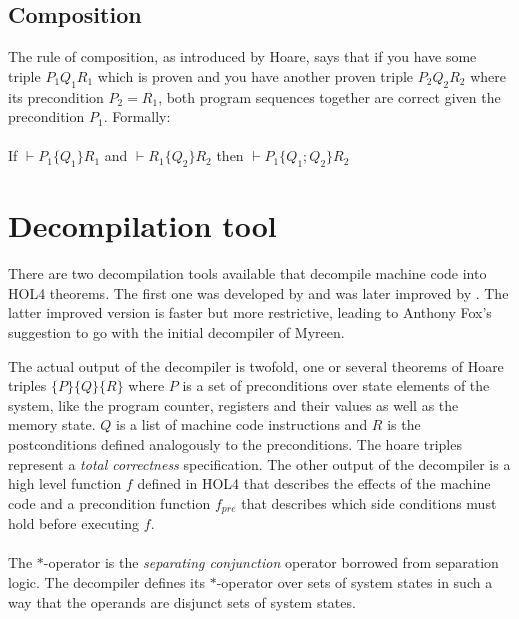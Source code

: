 \documentclass[fleqn]{kththesis}
\begin{document}
\subsection{Composition}
The rule of composition, as introduced by Hoare, says that if you have some triple $P_{1} Q_{1} R_{1}$ which is proven and you have another proven triple $P_{2} Q_{2} R_{2}$ where its precondition $P_{2} = R_{1}$, both program sequences together are correct given the precondition $P_{1}$. Formally:

\paragraph{}
If $\vdash P_{1} \{Q_{1} \} R_{1}$ and $\vdash R_{1} \{Q_{2}\}  R_{2}$ then  $\vdash P_{1} \{Q_{1}; Q_{2}\} R_{2}$


\section{Decompilation tool}
There are two decompilation tools available that decompile machine code into HOL4 theorems.
The first one was developed by \textcite{myreen_decompile} and was later improved by \textcite{anthony_decompile}. The latter improved version is faster but more restrictive, leading to Anthony Fox's suggestion to go with the initial decompiler of Myreen.

The actual output of the decompiler is twofold, one or several theorems of Hoare triples $\{P\} \{Q\} \{R\}$ where $P$ is a set of preconditions over state elements of the system, like the program counter, registers and their values as well as the memory state. $Q$ is a list of machine code instructions and $R$ is the postconditions defined analogously to the preconditions. The hoare triples represent a \emph{total correctness} specification. The other output of the decompiler is a high level function $f$ defined in HOL4 that describes the effects of the machine code and a precondition function $f_{pre}$ that describes which side conditions must hold before executing $f$.


\paragraph{}
The $\ast$-operator is the \emph{separating conjunction} operator borrowed from separation logic. The decompiler defines its $\ast$-operator over sets of system states in such a way that the operands are disjunct sets of system states. 
\end{document}
